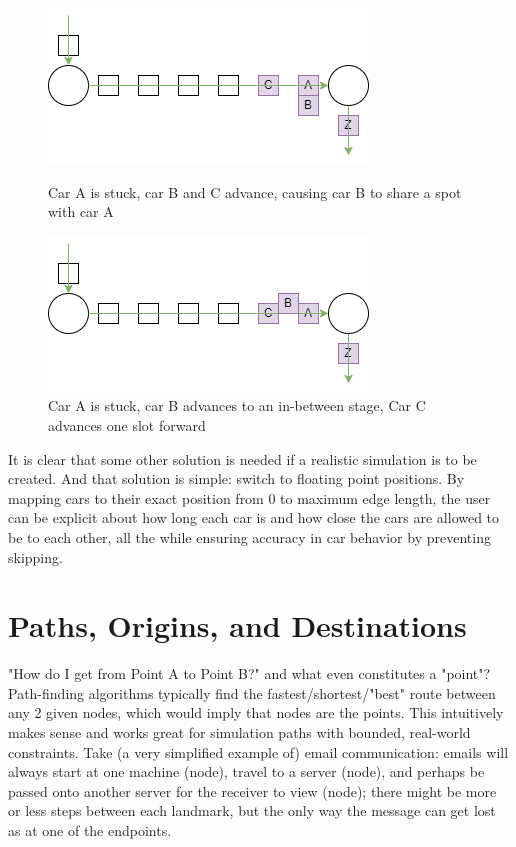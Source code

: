 \begin{figure}[H]
    \centering
	\includegraphics[width=0.75\linewidth]{tex files/Figures/BasicDiscrete_Overlap.png}
	\caption[Discrete positions: multiple cars at one location]{Car A is stuck, car B and C advance, causing car B to share a spot with car A}
	\label{fig:BasicDiscrete_overlap}
	
	\includegraphics[width=0.75\linewidth]{tex files/Figures/BasicDiscrete_between.png}
	\caption[Discrete positions: non-fixed locations]{Car A is stuck, car B advances to an in-between stage, Car C advances one slot forward}
	\label{fig:BasicDiscrete_between}
\end{figure}

\par It is clear that some other solution is needed if a realistic simulation is to be created.  And that solution is simple:  switch to floating point positions.  By mapping cars to their exact position from 0 to maximum edge length, the user can be explicit about how long each car is and how close the cars are allowed to be to each other, all the while ensuring accuracy in car behavior by preventing skipping.


\section{Paths, Origins, and Destinations}

\par "How do I get from Point A to Point B?" and what even constitutes a "point"?  Path-finding algorithms typically find the fastest/shortest/"best" route between any 2 given nodes, which would imply that nodes are the points. This intuitively makes sense and works great for simulation paths with bounded, real-world constraints.  Take (a very simplified example of) email communication:  emails will always start at one machine (node), travel to a server (node), and perhaps be passed onto another server for the receiver to view (node); there might be more or less steps between each landmark, but the only way the message can get lost as at one of the endpoints.  \\

